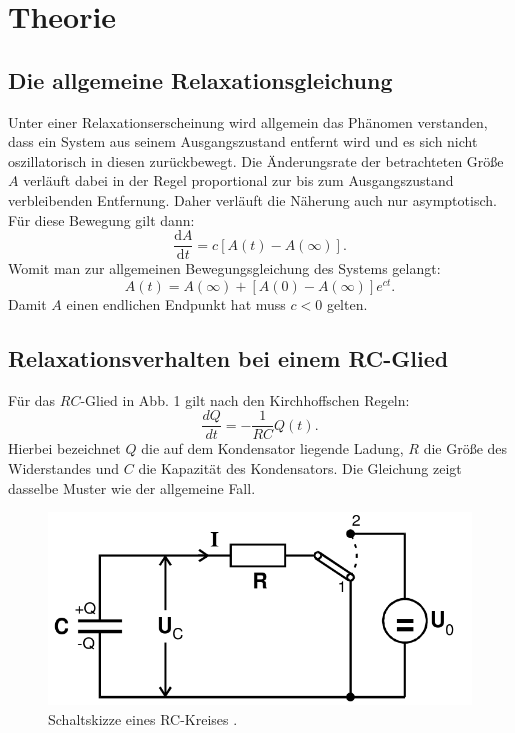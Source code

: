 \section{Theorie}
\label{sec:Theorie}
\subsection{Die allgemeine Relaxationsgleichung}
Unter einer Relaxationserscheinung wird allgemein das Phänomen verstanden, dass
 ein System aus seinem Ausgangszustand entfernt wird und es sich nicht oszillatorisch
 in diesen zurückbewegt. Die Änderungsrate der betrachteten Größe $A$ verläuft dabei
 in der Regel proportional zur bis zum Ausgangszustand verbleibenden Entfernung. Daher
  verläuft die Näherung auch nur asymptotisch. Für diese
 Bewegung gilt dann:
 \begin{equation}
   \frac{\text{d}A}{\text{d}t} = c[A(t)-A(\infty)]\text{.}
 \end{equation}
Womit man zur allgemeinen Bewegungsgleichung des Systems gelangt:
\begin{equation}
  A(t) = A(\infty)+[A(0)-A(\infty)]e^{ct}\text{.}
\end{equation}
Damit $A$ einen endlichen Endpunkt hat muss $ c < 0$ gelten.

\subsection{Relaxationsverhalten bei einem RC-Glied}

Für das $RC$-Glied in Abb. 1 gilt nach den Kirchhoffschen Regeln:
\begin{equation}
  \frac{dQ}{dt} = -\frac{1}{RC}Q(t)\text{.}
\end{equation}
Hierbei bezeichnet $Q$ die auf dem Kondensator liegende
 Ladung, $R$ die Größe des Widerstandes und $C$ die Kapazität des Kondensators.
Die Gleichung zeigt dasselbe Muster wie der allgemeine Fall.
\begin{figure}[H]
  \centering
  \includegraphics[width=\linewidth-200pt,height=\textheight-200pt,keepaspectratio]{content/RC_Kreis1.png}
  \caption{Schaltskizze eines RC-Kreises \cite{V353}.}
  \label{fig:RC_Kreis1}
\end{figure}

